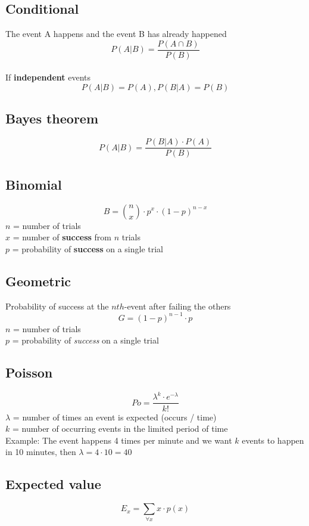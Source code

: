 
\subsection{Conditional} 
The event A happens and the event B has already happened
\[ P(A | B) = \frac{P(A \cap B)}{P(B)} \] \\
If \textbf{independent} events
\[ P(A|B) = P(A) , P(B|A) = P(B) \]

\subsection{Bayes theorem}
\[ P(A|B) = \frac{ P(B | A) \cdot P(A) }{ P(B) } \]

\subsection{Binomial}
\[ B = {n \choose x} \cdot p^{x} \cdot (1 - p)^{n-x} \]
$n$	=	number of trials \\
$x$	=	number of \textbf{success} from $n$ trials \\
$p$	=	probability of \textbf{success} on a single trial


\subsection{Geometric}
Probability of success at the $nth$-event after failing the others
\[ G = (1 - p)^{n - 1} \cdot p \]
$n$	=	number of trials \\
$p$	=	probability of \emph{success} on a single trial


\subsection{Poisson}
\[ Po = \frac{\lambda ^ k \cdot e ^ {-\lambda}}{k!} \]
$\lambda$ = number of times an event is expected (occurs / time)  \\
$k$ = number of occurring events in the limited period of time \\

Example: The event happens 4 times per minute and we want $k$ events to happen in 10 minutes, then $\lambda = 4 \cdot 10 = 40$

\subsection{Expected value}
\[ E_x = \sum_{\forall x} x \cdot p(x) \]


